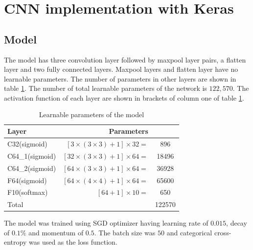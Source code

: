 \documentclass[10pt, a4paper, twocolumn]{article}
\begin{document}
\section{CNN implementation with Keras}
\subsection{Model}
The model has three convolution layer followed by maxpool layer pairs, a flatten layer and two fully connected layers. Maxpool layers and flatten layer have no learnable parameters. The number of parameters in other layers are shown in table \ref{table: tab1}. The number of total learnable parameters of the network is $122,570$. The activation function of each layer are shown in brackets of column one of table \ref{table: tab1}.
\begin{table}
\centering
\begin{tabular}{|l|r c|}
\hline
Layer &Parameters &\\
\hline
C32(sigmoid) & $ [3 \times (3 \times 3) + 1] \times 32 =$ &896\\
C64\_1(sigmoid) & $ [32 \times (3 \times 3) + 1] \times 64 =$ &18496\\
C64\_2(sigmoid) & $ [64 \times (3 \times 3) + 1] \times 64 =$ &36928\\
F64(sigmoid) & $ [64 \times (4 \times 4) + 1] \times 64 =$ &65600\\
F10(softmax) & $ [64 + 1] \times 10 =$ &650\\
\hline
Total & & 122570\\
\hline
\end{tabular}
\caption{Learnable parameters of the model}
\label{table: tab1}
\end{table}
The model was trained using SGD optimizer having learning rate of $0.015$, decay of $0.1\%$ and momentum of $0.5$. The batch size was $50$ and categorical cross-entropy was used as the loss function.
\end{document}
